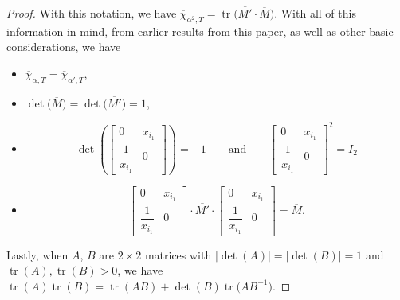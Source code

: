 \documentclass[pdftex]{sigma}
\numberwithin{equation}{section}
\theoremstyle{definition}
\begin{document}
\begin{proof}
With this notation, we have $\overline{\chi}_{\alpha^2, T}=\operatorname{tr}\bigl(\overline{M'}\cdot \overline{M}\bigr)$. With all of this information in mind, from earlier results from this paper, as well as other basic considerations, we have
\begin{itemize}\itemsep=0pt
 \item $\overline{\chi}_{\alpha, T}=\overline{\chi}_{\alpha', T}$,
 \item $\det\bigl(\overline{M}\bigr)=\det\bigl(\overline{M'}\bigr)=1$,
 \item
 \[
 \det\left(\begin{bmatrix}
 0 & x_{i_1}\\
 \dfrac{1}{x_{i_1}} & 0
\end{bmatrix}\right)=-1\qquad \text{and}\qquad \begin{bmatrix}
 0 & x_{i_1}\\
 \dfrac{1}{x_{i_1}} & 0
\end{bmatrix}^2=I_2\]
\item \[
\begin{bmatrix}
 0 & x_{i_1}\\
 \dfrac{1}{x_{i_1}} & 0
\end{bmatrix}\cdot \overline{M'}\cdot
\begin{bmatrix}
 0 & x_{i_1}\\
 \dfrac{1}{x_{i_1}} & 0
\end{bmatrix}=\overline{M}.\]
\end{itemize}
 Lastly, when $A$, $B$ are $2\times 2$ matrices with $|{\det(A)}|=|{\det(B)}|=1$ and $\operatorname{tr}(A), \operatorname{tr}(B)>0$, we have $\operatorname{tr}(A)\operatorname{tr}(B)=\operatorname{tr}(AB)+\det(B)\operatorname{tr}\bigl(AB^{-1}\bigr)$.


\end{proof}
\end{document}
